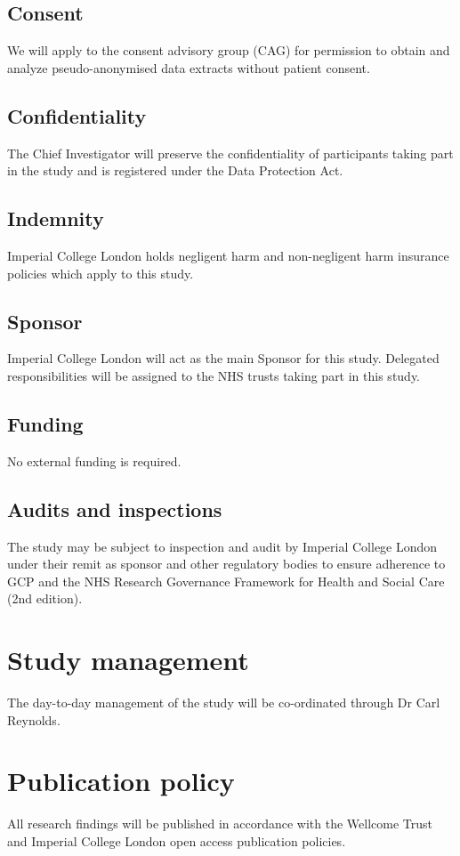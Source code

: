 \documentclass[a4paper,10pt]{article}
\begin{document}
\subsection{Consent}
We will apply to the consent advisory group (CAG) for permission to obtain and analyze pseudo-anonymised data extracts without patient consent.

\subsection{Confidentiality}
The Chief Investigator will preserve the confidentiality of participants taking part in the study and is registered under the Data Protection Act.

\subsection{Indemnity}
Imperial College London holds negligent harm and non-negligent harm insurance policies which apply to this study.

\subsection{Sponsor}
Imperial College London will act as the main Sponsor for this study. Delegated responsibilities will be assigned to the NHS trusts taking part in this study.  


\subsection{Funding}
No external funding is required.

\subsection{Audits and inspections}
The study may be subject to inspection and audit by Imperial College London under their remit as sponsor and other regulatory bodies to ensure adherence to GCP and the NHS Research Governance Framework for Health and Social Care (2nd edition). 

\section{Study management}
The day-to-day management of the study will be co-ordinated through Dr Carl Reynolds.

\section{Publication policy}
All research findings will be published in accordance with the Wellcome Trust and Imperial College London open access publication policies.
\end{document}
